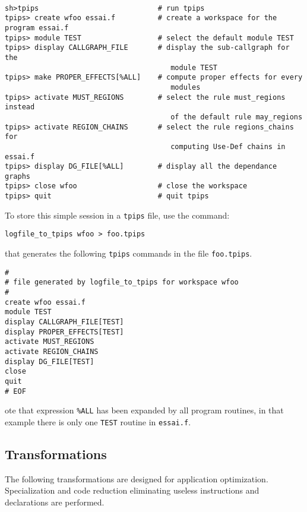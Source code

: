 \documentclass[a4paper,12pt]{article}
\begin{document}
\begin{verbatim}

sh>tpips                            # run tpips
tpips> create wfoo essai.f          # create a workspace for the program essai.f
tpips> module TEST                  # select the default module TEST
tpips> display CALLGRAPH_FILE       # display the sub-callgraph for the
                                       module TEST
tpips> make PROPER_EFFECTS[%ALL]    # compute proper effects for every
                                       modules
tpips> activate MUST_REGIONS        # select the rule must_regions instead
                                       of the default rule may_regions
tpips> activate REGION_CHAINS       # select the rule regions_chains for
                                       computing Use-Def chains in essai.f
tpips> display DG_FILE[%ALL]        # display all the dependance graphs
tpips> close wfoo                   # close the workspace
tpips> quit                         # quit tpips
\end{verbatim}

To store this simple session in a {\tt tpips} file, use the command:
\begin{verbatim}
logfile_to_tpips wfoo > foo.tpips
\end{verbatim}
that generates the following {\tt tpips} commands in the file
\verb+foo.tpips+.

\begin{verbatim}
#
# file generated by logfile_to_tpips for workspace wfoo
#
create wfoo essai.f
module TEST
display CALLGRAPH_FILE[TEST]
display PROPER_EFFECTS[TEST]
activate MUST_REGIONS
activate REGION_CHAINS
display DG_FILE[TEST]
close
quit
# EOF
\end{verbatim}

ote that  expression  \verb+%ALL+ has been expanded by all
program routines, in that example there is only one \verb+TEST+
routine in \verb+essai.f+.


\subsection{Transformations}
\label{exm3}

The following transformations are designed for application optimization.
Specialization and code reduction eliminating useless instructions and
declarations are performed.
\end{document}
